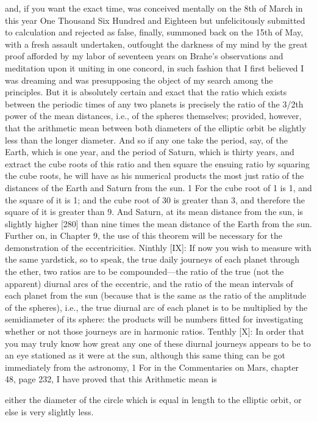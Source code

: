 \documentclass{article}
\begin{document}
and, if you want the exact time, was conceived mentally on the 8th of
March in this year One Thousand Six Hundred and Eighteen but
unfelicitously submitted to calculation and rejected as false, finally,
summoned back on the 15th of May, with a fresh assault undertaken,
outfought the darkness of my mind by the great proof afforded by my
labor of seventeen years on Brahe's observations and meditation upon it
uniting in one concord, in such fashion that I first believed I was
dreaming and was presupposing the object of my search among the
principles. But it is absolutely certain and exact that the ratio which
exists between the periodic times of any two planets is precisely the
ratio of the 3/2th power of the mean distances, i.e., of the spheres
themselves; provided, however, that the arithmetic mean between both
diameters of the elliptic orbit be slightly less than the longer diameter.
And so if any one take the period, say, of the Earth, which is one year,
and the period of Saturn, which is thirty years, and extract the cube roots
of this ratio and then square the ensuing ratio by squaring the cube
roots, he will have as his numerical products the most just ratio of the
distances of the Earth and Saturn from the sun. 1 For the cube root of 1
is 1, and the square of it is 1; and the cube root of 30 is greater than 3,
and therefore the square of it is greater than 9. And Saturn, at its mean
distance from the sun, is slightly higher [280] than nine times the mean
distance of the Earth from the sun. Further on, in Chapter 9, the use of
this theorem will be necessary for the demonstration of the
eccentricities.
Ninthly [IX]: If now you wish to measure with the same yardstick, so to
speak, the true daily journeys of each planet through the ether, two ratios
are to be compounded—the ratio of the true (not the apparent) diurnal
arcs of the eccentric, and the ratio of the mean intervals of each planet
from the sun (because that is the same as the ratio of the amplitude of
the spheres), i.e., the true diurnal arc of each planet is to be multiplied
by the semidiameter of its sphere: the products will be numbers fitted
for investigating whether or not those journeys are in harmonic ratios.
Tenthly [X]: In order that you may truly know how great any one of these
diurnal journeys appears to be to an eye stationed as it were at the sun,
although this same thing can be got immediately from the astronomy,
1 For in the Commentaries on Mars, chapter 48, page 232, I have proved that this Arithmetic mean is

either the diameter of the circle which is equal in length to the elliptic orbit, or else is very slightly less.
\end{document}
